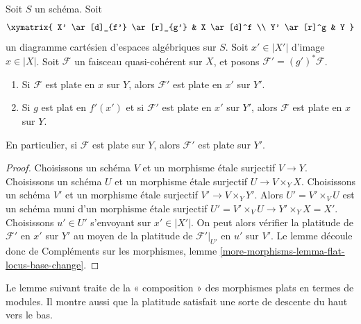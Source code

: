 \begin{lemma}
\label{lemma-base-change-module-flat}
Soit $S$ un schéma. Soit
$$
\xymatrix{
X' \ar[d]_{f'} \ar[r]_{g'} & X \ar[d]^f \\
Y' \ar[r]^g & Y
}
$$
un diagramme cartésien d'espaces algébriques sur $S$. Soit $x' \in |X'|$
d'image $x \in |X|$. Soit $\mathcal{F}$ un faisceau quasi-cohérent
sur $X$, et posons $\mathcal{F}' = (g')^*\mathcal{F}$.
\begin{enumerate}
\item Si $\mathcal{F}$ est plate en $x$ sur $Y$,
alors $\mathcal{F}'$ est plate en $x'$ sur $Y'$.
\item Si $g$ est plat en $f'(x')$ et si
$\mathcal{F}'$ est plate en $x'$ sur $Y'$, alors
$\mathcal{F}$ est plate en $x$ sur $Y$.
\end{enumerate}
En particulier, si $\mathcal{F}$ est plate sur $Y$, alors
$\mathcal{F}'$ est plate sur $Y'$.
\end{lemma}

\begin{proof}
Choisissons un schéma $V$ et un morphisme étale surjectif $V \to Y$.
Choisissons un schéma $U$ et un morphisme étale surjectif $U \to V \times_Y X$.
Choisissons un schéma $V'$ et un morphisme étale surjectif $V' \to V \times_Y Y'$.
Alors $U' = V' \times_V U$ est un schéma muni d'un morphisme étale
surjectif $U' = V' \times_V U \to Y' \times_Y X = X'$. Choisissons $u' \in U'$
s'envoyant sur $x' \in |X'|$. On peut alors vérifier la platitude de
$\mathcal{F}'$ en $x'$ sur $Y'$ au moyen de la platitude de
$\mathcal{F}'|_{U'}$ en $u'$ sur $V'$. Le lemme découle donc de
Compléments sur les morphismes, lemme \ref{more-morphisms-lemma-flat-locus-base-change}.
\end{proof}

\noindent
Le lemme suivant traite de la « composition » des morphismes plats en
termes de modules. Il montre aussi que la platitude satisfait une sorte de
descente du haut vers le bas.

